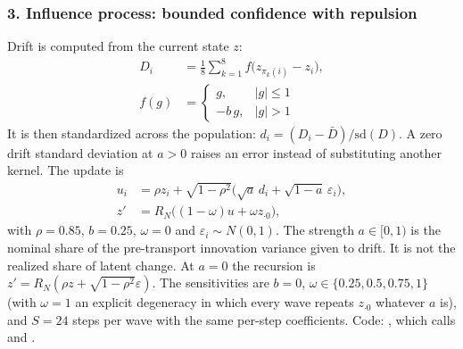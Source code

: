 \subsubsection*{3. Influence process: bounded confidence with repulsion}
Drift is computed from the current state $z$:
\begin{align*}
D_i&=\frac18\sum_{k=1}^8 f\bigl(z_{\pi_k(i)}-z_i\bigr),\\
f(g)&=\begin{cases}g,&|g|\le1\\-b\,g,&|g|>1\end{cases}
\end{align*}
It is then standardized across the population: $d_i=(D_i-\bar D)/\mathrm{sd}(D)$. A zero drift standard deviation at $a>0$ raises an error instead of substituting another kernel. The update is
\begin{align*}
u_i&=\rho z_i+\sqrt{1-\rho^2}\bigl(\sqrt a\,d_i+\sqrt{1-a}\,\varepsilon_i\bigr),\\
z'&=R_N\bigl((1-\omega)u+\omega z_{\cdot0}\bigr),
\end{align*}
with $\rho=0.85$, $b=0.25$, $\omega=0$ and $\varepsilon_i\sim N(0,1)$. The strength $a\in[0,1)$ is the nominal share of the pre-transport innovation variance given to drift. It is not the realized share of latent change. At $a=0$ the recursion is $z'=R_N(\rho z+\sqrt{1-\rho^2}\varepsilon)$. The sensitivities are $b=0$, $\omega\in\{0.25,0.5,0.75,1\}$ (with $\omega=1$ an explicit degeneracy in which every wave repeats $z_{\cdot0}$ whatever $a$ is), and $S=24$ steps per wave with the same per-step coefficients. Code: , which calls  and .

